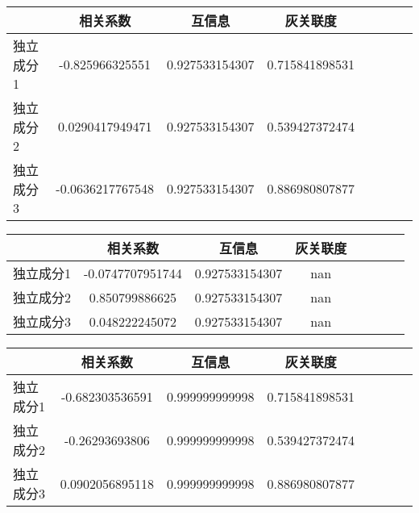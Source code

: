 \begin{table}[!htbp] 
\begin{center}
\begin{tabular}{lccclccc} 
 \toprule 
& 相关系数   & 互信息    &灰关联度 \\ 
\midrule 
独立成分1	& -0.825966325551	& 0.927533154307	& 0.715841898531	\\ 
独立成分2	& 0.0290417949471	& 0.927533154307	& 0.539427372474	\\ 
独立成分3	& -0.0636217767548	& 0.927533154307	& 0.886980807877	\\ 
\bottomrule 
 \end{tabular} 
\end{center} 
 \end{table} 


\begin{table}[!htbp] 
\begin{center}
\begin{tabular}{lccclccc} 
 \toprule 
& 相关系数   & 互信息    &灰关联度 \\ 
\midrule 
独立成分1	& -0.0747707951744	& 0.927533154307	& nan	\\ 
独立成分2	& 0.850799886625	& 0.927533154307	& nan	\\ 
独立成分3	& 0.048222245072	& 0.927533154307	& nan	\\ 
\bottomrule 
 \end{tabular} 
\end{center} 
 \end{table} 


\begin{table}[!htbp] 
\begin{center}
\begin{tabular}{lccclccc} 
 \toprule 
& 相关系数   & 互信息    &灰关联度 \\ 
\midrule 
独立成分1	& -0.682303536591	& 0.999999999998	& 0.715841898531	\\ 
独立成分2	& -0.26293693806	& 0.999999999998	& 0.539427372474	\\ 
独立成分3	& 0.0902056895118	& 0.999999999998	& 0.886980807877	\\ 
\bottomrule 
 \end{tabular} 
\end{center} 
 \end{table} 


